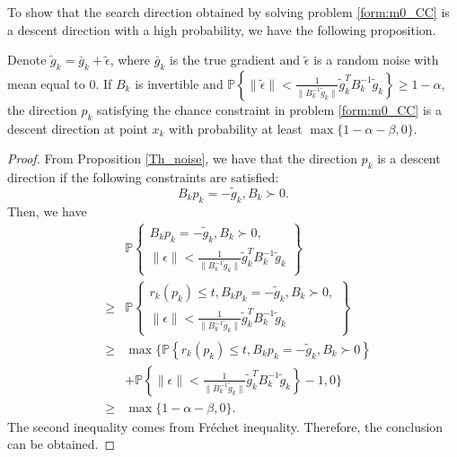 \documentclass[11pt,twoside]{article}
\begin{document}
To show that the search direction obtained by solving problem
\eqref{form:m0_CC} is a descent direction with a high probability, we
have the following proposition.

\begin{proposition}\label{Th_noiseCC}
Denote $\tilde{g}_k = \bar{g}_k + \tilde{\epsilon}$, where $\bar{g}_k$ is the true gradient and $\tilde{\epsilon}$ is a random noise with mean equal to $0$.
If $B_k$ is invertible and $\mathbb{P}\left\{\|\tilde{\epsilon}\| <  \frac{1}{\|B_k^{-1}\tilde{g}_k\|}\tilde{g}_k^TB_k^{-1}\tilde{g}_k\right\} \geq 1 - \alpha$, the direction $p_k$ satisfying the chance constraint in problem \eqref{form:m0_CC} is a descent direction at point $x_k$ with probability at least $\max\{1-\alpha -\beta,0\}$.
\end{proposition}
\begin{proof}
  From Proposition \ref{Th_noise}, we have that the direction $p_k$ is a descent direction if the following constraints are satisfied:
   \[
   B_k p_k = -\tilde{g}_k,
   B_k \succ 0.
   \]
Then, we have
\begin{eqnarray*}
   && \mathbb{P}\left\{
\begin{array}{l}
  B_k p_k = -\tilde{g}_k,
  B_k \succ 0,\\
  \|\epsilon\| <  \frac{1}{\|B_k^{-1}\tilde{g}_k\|}\tilde{g}_k^TB_k^{-1}\tilde{g}_k
\end{array}
\right\} \\
    &\geq&\mathbb{P}\left\{
\begin{array}{l}
  r_k(p_k) \leq t, B_k p_k = -\tilde{g}_k, B_k \succ 0,\\
  \|\epsilon\| <  \frac{1}{\|B_k^{-1}\tilde{g}_k\|}\tilde{g}_k^TB_k^{-1}\tilde{g}_k
\end{array}
\right\} \\
   &\geq& \max\Bigg\{\mathbb{P}\left\{
  r_k(p_k) \leq t, B_k p_k = -\tilde{g}_k, B_k \succ 0
\right\}
\\
&& + \mathbb{P}\left\{\|\epsilon\| <  \frac{1}{\|B_k^{-1}\tilde{g}_k\|}\tilde{g}_k^TB_k^{-1}\tilde{g}_k\right\} - 1,0 \Bigg\} \\
&\geq & \max\{1-\alpha-\beta,0\}.
\end{eqnarray*}
The second inequality comes from Fr\'echet inequality.
Therefore, the conclusion can be obtained.
\end{proof}
\end{document}
